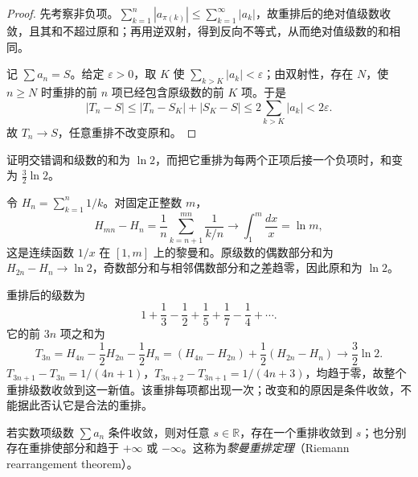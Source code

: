 \begin{proof}
先考察非负项。$\sum_{k=1}^n|a_{\pi(k)}|\leq\sum_{k=1}^{\infty}|a_k|$，故重排后的绝对值级数收敛，且其和不超过原和；再用逆双射，得到反向不等式，从而绝对值级数的和相同。

记 $\sum a_n=S$。给定 $\varepsilon>0$，取 $K$ 使 $\sum_{k>K}|a_k|<\varepsilon$；由双射性，存在 $N$，使 $n\geq N$ 时重排的前 $n$ 项已经包含原级数的前 $K$ 项。于是
\[
    |T_n-S|
    \leq|T_n-S_K|+|S_K-S|
    \leq2\sum_{k>K}|a_k|<2\varepsilon.
\]
故 $T_n\to S$，任意重排不改变原和。
\end{proof}

\begin{example}
\label{ex:alternating-harmonic-rearrangement}
证明交错调和级数的和为 $\ln2$，而把它重排为每两个正项后接一个负项时，和变为 $\frac32\ln2$。
\end{example}

\begin{solve}
令 $H_n=\sum_{k=1}^n1/k$。对固定正整数 $m$，
\[
    H_{mn}-H_n=\frac1n\sum_{k=n+1}^{mn}\frac1{k/n}
       \longrightarrow\int_1^m\frac{dx}{x}=\ln m,
\]
这是连续函数 $1/x$ 在 $[1,m]$ 上的黎曼和。原级数的偶数部分和为 $H_{2n}-H_n\to\ln2$，奇数部分和与相邻偶数部分和之差趋零，因此原和为 $\ln2$。

重排后的级数为
\[
    1+\frac13-\frac12+\frac15+\frac17-\frac14+\cdots.
\]
它的前 $3n$ 项之和为
\[
    T_{3n}=H_{4n}-\frac12H_{2n}-\frac12H_n
          =(H_{4n}-H_{2n})+\frac12(H_{2n}-H_n)
          \longrightarrow\frac32\ln2.
\]
$T_{3n+1}-T_{3n}=1/(4n+1)$，$T_{3n+2}-T_{3n+1}=1/(4n+3)$，均趋于零，故整个重排级数收敛到这一新值。该重排每项都出现一次；改变和的原因是条件收敛，不能据此否认它是合法的重排。
\end{solve}

\begin{theorem}[黎曼重排定理]
\label{thm:riemann-rearrangement}
若实数项级数 $\sum a_n$ 条件收敛，则对任意 $s\in\mathbb R$，存在一个重排收敛到 $s$；也分别存在重排使部分和趋于 $+\infty$ 或 $-\infty$。这称为\emph{黎曼重排定理}（Riemann rearrangement theorem）。
\end{theorem}

